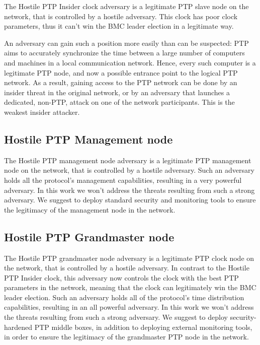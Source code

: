 \documentclass[11pt]{article}
\begin{document}
The Hostile PTP Insider clock adversary is a legitimate PTP slave node on the network, that is controlled by a hostile adversary. This clock has poor clock parameters, thus it can't win the BMC leader election in a legitimate way.

An adversary can gain such a position more easily than can be suspected: PTP aims to accurately synchronize the time between a large number of computers and machines in a local communication network. Hence, every such computer is a legitimate PTP node, and now a possible entrance point to the logical PTP network. As a result, gaining access to the PTP network can be done by an insider threat in the original network, or by an adversary that launches a dedicated, non-PTP, attack on one of the network participants. This is the weakest insider attacker.



\subsection{Hostile PTP Management node}\label{adv:tech}

The Hostile PTP management node adversary is a legitimate PTP management node on the network, that is controlled by a hostile adversary. Such an adversary holds all the protocol's management capabilities, resulting in a very powerful adversary. In this work we won't address the threats resulting from such a strong adversary. We suggest to deploy standard security and monitoring tools to ensure the legitimacy of the management node in the network.



\subsection{Hostile PTP Grandmaster node}\label{adv:master}

The Hostile PTP grandmaster node adversary is a legitimate PTP clock node on the network, that is controlled by a hostile adversary. In contrast to the Hostile PTP Insider clock, this adversary now controls the clock with the best PTP parameters in the network, meaning that the clock can legitimately win the BMC leader election. Such an adversary holds all of the protocol's time distribution capabilities, resulting in an all powerful adversary. In this work we won't address the threats resulting from such a strong adversary. We suggest to deploy security-hardened PTP middle boxes, in addition to deploying external monitoring tools, in order to ensure the legitimacy of the grandmaster PTP node in the network.
\end{document}
